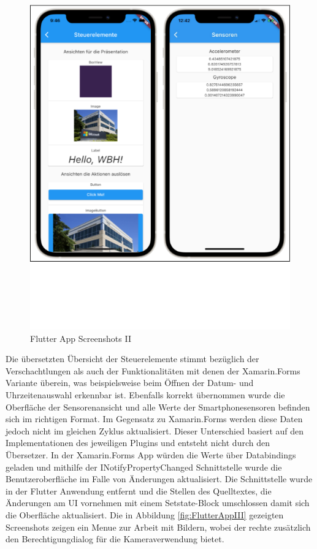 \begin{figure}[!ht]
 \includegraphics[width=\textwidth,keepaspectratio]{Images/Screenshot/Flutter2ios.png}
 \caption{Flutter App Screenshots II}
 \label{fig:FlutterAppII}
\end{figure}
Die übersetzten Übersicht der Steuerelemente stimmt  bezüglich der Verschachtlungen als auch der Funktionalitäten mit denen der Xamarin.Forms Variante überein,  was beispielsweise beim Öffnen der Datum- und Uhrzeitenauswahl erkennbar ist. Ebenfalls korrekt übernommen wurde die Oberfläche der Sensorenansicht und alle Werte der Smartphonesensoren befinden sich im richtigen Format. Im Gegensatz zu Xamarin.Forms werden diese Daten jedoch nicht im gleichen Zyklus aktualisiert.  Dieser Unterschied basiert auf den Implementationen des jeweiligen Plugins und entsteht nicht durch den Übersetzer.  In der Xamarin.Forms App würden die Werte über Databindings geladen und mithilfe der INotifyPropertyChanged Schnittstelle wurde die Benutzeroberfläche im Falle von Änderungen aktualisiert.  Die Schnittstelle wurde in der Flutter Anwendung entfernt und die Stellen des Quelltextes, die Änderungen am UI vornehmen mit einem Setstate-Block umschlossen damit sich die Oberfläche aktualisiert.  Die in Abbildung \ref{fig:FlutterAppIII}   gezeigten Screenshots zeigen ein Menue zur Arbeit mit Bildern, wobei der rechte zusätzlich den Berechtigungdialog für die Kameraverwendung bietet. 


